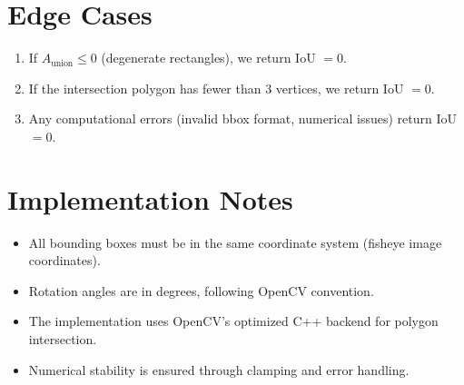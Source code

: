 \documentclass[11pt]{article}
\begin{document}
\section{Edge Cases}

\begin{enumerate}[nosep]
    \item If $A_{\text{union}} \leq 0$ (degenerate rectangles), we return IoU $= 0$.
    \item If the intersection polygon has fewer than 3 vertices, we return IoU $= 0$.
    \item Any computational errors (invalid bbox format, numerical issues) return IoU $= 0$.
\end{enumerate}

\section{Implementation Notes}

\begin{itemize}[nosep]
    \item All bounding boxes must be in the same coordinate system (fisheye image coordinates).
    \item Rotation angles are in degrees, following OpenCV convention.
    \item The implementation uses OpenCV's optimized C++ backend for polygon intersection.
    \item Numerical stability is ensured through clamping and error handling.
\end{itemize}
\end{document}
